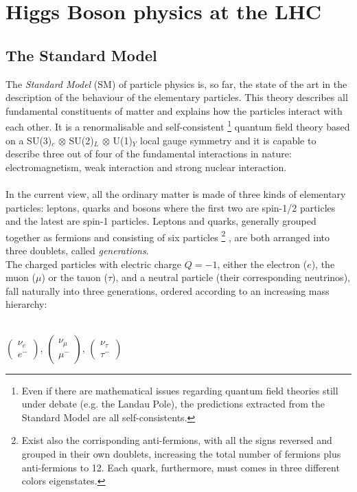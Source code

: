 \chapter{Higgs Boson physics at the LHC}
\label{capitolo_1}
\section{The Standard Model}
The \emph{Standard Model} (SM) of particle physics is, so far, the state of the art in the description of the behaviour of the elementary particles. This theory describes all fundamental constituents of matter and explains how the particles interact with each other. It is a renormalisable and self-consistent 
\footnote{Even if there are mathematical issues regarding quantum field theories still under debate (e.g. the Landau Pole), the predictions extracted from the Standard Model are all self-consistents.} 
quantum field theory based on a SU(3)$_{c}$ $\otimes$ SU(2)$_{L}$ $\otimes$ U(1)$_{Y}$ local gauge symmetry and it is capable to describe three out of four of the fundamental interactions in nature: electromagnetism, weak interaction and strong nuclear interaction.
\\\\
In the current view, all the ordinary matter is made of three kinds of elementary particles: leptons, quarks and bosons where the first two are spin-1/2 particles and the latest are spin-1 particles. Leptons and quarks, generally grouped together as fermions and consisting of six particles
\footnote{Exist also the corrisponding anti-fermions, with all the signs reversed and grouped in their own doublets, increasing the total number of fermions plus anti-fermions to 12. Each quark, furthermore, must comes in three different colors eigenstates.}
, are both arranged into three doublets, called \emph{generations}.
\\
The charged particles with electric charge $Q = -1$, either the electron ($e$), the muon ($\mu$) or the tauon ($\tau$), and a neutral particle (their corresponding neutrinos), fall naturally into three generations, ordered according to an increasing mass hierarchy:
\\\\
\phantom{i}
\begin{center}
$\begin{pmatrix}
\nu_{e} \\ e^- 
\end{pmatrix}$,\hspace{0.2cm}  
$\begin{pmatrix}
\nu_{\mu} \\ \mu^-
\end{pmatrix}$,\hspace{0.2cm}
$\begin{pmatrix}
\nu_{\tau} \\ \tau^-
\end{pmatrix}$
\end{center}
